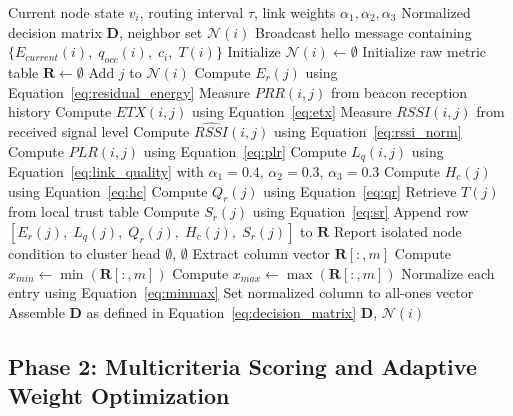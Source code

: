 \documentclass[a4paper,fleqn]{cas-dc}
\numberwithin{equation}{section}
\begin{document}
\begin{algorithm}[htbp]
\small
\caption{Phase 1: Distributed Metric Collection and Normalization}
\label{alg:phase1}
\begin{algorithmic}[1]
\REQUIRE Current node state $v_i$, routing interval $\tau$,
         link weights $\alpha_1, \alpha_2, \alpha_3$
\ENSURE Normalized decision matrix $\mathbf{D}$,
        neighbor set $\mathcal{N}(i)$
\STATE Broadcast hello message containing
       $\{E_{current}(i),\; q_{occ}(i),\; c_i,\; T(i)\}$
\STATE Initialize $\mathcal{N}(i) \leftarrow \emptyset$
\STATE Initialize raw metric table $\mathbf{R} \leftarrow \emptyset$
  \STATE Add $j$ to $\mathcal{N}(i)$
  \STATE Compute $E_r(j)$ using Equation~\ref{eq:residual_energy}
  \STATE Measure $PRR(i,j)$ from beacon reception history
  \STATE Compute $ETX(i,j)$ using Equation~\ref{eq:etx}
  \STATE Measure $RSSI(i,j)$ from received signal level
  \STATE Compute $\widehat{RSSI}(i,j)$ using
         Equation~\ref{eq:rssi_norm}
  \STATE Compute $PLR(i,j)$ using Equation~\ref{eq:plr}
  \STATE Compute $L_q(i,j)$ using Equation~\ref{eq:link_quality}
         with $\alpha_1=0.4$, $\alpha_2=0.3$, $\alpha_3=0.3$
  \STATE Compute $H_c(j)$ using Equation~\ref{eq:hc}
  \STATE Compute $Q_r(j)$ using Equation~\ref{eq:qr}
  \STATE Retrieve $T(j)$ from local trust table
  \STATE Compute $S_r(j)$ using Equation~\ref{eq:sr}
  \STATE Append row $[E_r(j),\;L_q(j),\;Q_r(j),\;H_c(j),\;S_r(j)]$
         to $\mathbf{R}$
\ENDFOR
{}
  \STATE Report isolated node condition to cluster head
  \RETURN $\emptyset$, $\emptyset$
\ENDIF
{}
  \STATE Extract column vector $\mathbf{R}[:,m]$
  \STATE Compute $x_{min} \leftarrow \min(\mathbf{R}[:,m])$
  \STATE Compute $x_{max} \leftarrow \max(\mathbf{R}[:,m])$
    \STATE Normalize each entry using Equation~\ref{eq:minmax}
  \ELSE
    \STATE Set normalized column to all-ones vector
  \ENDIF
\ENDFOR
\STATE Assemble $\mathbf{D}$ as defined in
       Equation~\ref{eq:decision_matrix}
\RETURN $\mathbf{D}$, $\mathcal{N}(i)$
\end{algorithmic}
\end{algorithm}

\subsection{Phase 2: Multicriteria Scoring and Adaptive Weight
Optimization}
\label{subsec:phase2}
\end{document}
